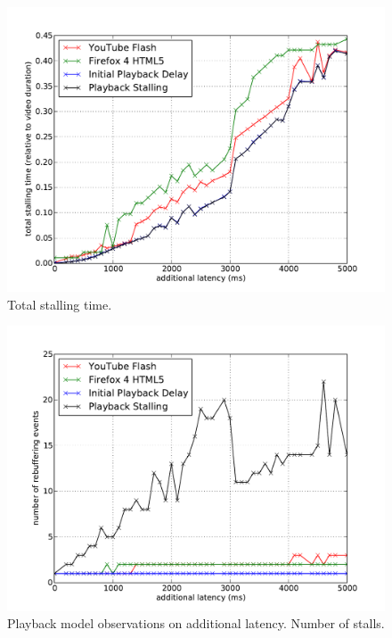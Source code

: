 \begin{figure}[htb]
    \centering
    \includegraphics[width=\textwidth]{images/eval-latency-stallingtime.pdf}
    \caption{Total stalling time.}
    \label{c3:fig:eval-latency-stallingtime}
\end{figure}

\begin{figure}[htb]
    \centering
    \includegraphics[width=\textwidth]{images/eval-latency-frequency.pdf}
    \caption{Playback model observations on additional latency. Number of stalls.}
    \label{c3:fig:eval-latency-numstalls}
\end{figure}


